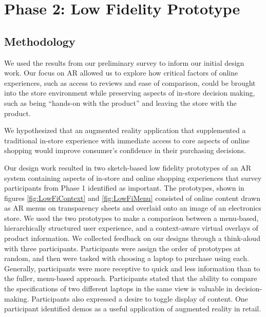 \section{Phase 2: Low Fidelity Prototype}
\subsection{Methodology}
We used the results from our preliminary survey to inform our initial design work. Our focus on AR allowed us to explore how critical factors of online experiences, such as access to reviews and ease of comparison, could be brought into the store environment while preserving aspects of in-store decision making, such as being ``hands-on with the product'' and leaving the store with the product. 

We hypothesized that an augmented reality application that supplemented a traditional in-store experience with immediate access to core aspects of online shopping would improve consumer's confidence in their purchasing decisions.  

Our design work resulted in two sketch-based low fidelity prototypes of an AR system containing aspects of in-store and online shopping experiences that survey participants from Phase 1 identified as important. The prototypes, shown in figures \ref{fig:LowFiContext} and \ref{fig:LowFiMenu} consisted of online content drawn as AR menus on transparency sheets and overlaid onto an image of an electronics store. 
We used the two prototypes to make a comparison between a menu-based, hierarchically structured user experience, and a context-aware virtual overlays of product information.
We collected feedback on our designs through a think-aloud with three participants.
Participants were assign the order of prototypes at random, and then were tasked with choosing a laptop to purchase using each. Generally, participants were more receptive to quick and less information than to the fuller, menu-based approach.  
Participants stated that the ability to compare the specifications of two different laptops in the same view is valuable in decision-making. Participants also expressed a desire to toggle display of content. One participant identified demos as a useful application of augmented reality in retail. 

